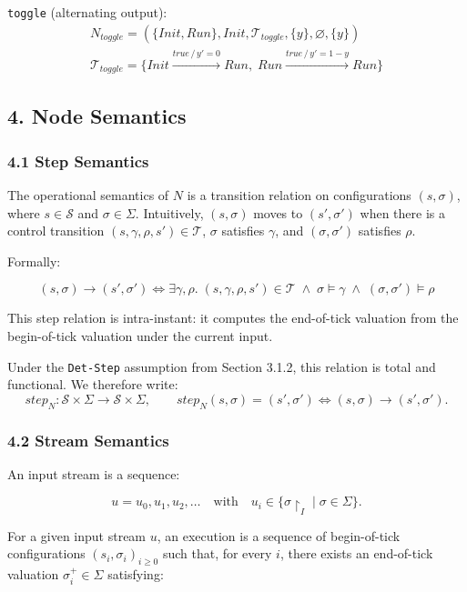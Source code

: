 \documentclass[
]{article}
\begin{document}
\texttt{toggle} (alternating output): \[
\begin{array}{l}
N_{toggle}=(\{Init,Run\},Init,\mathcal T_{toggle},\{y\},\varnothing,\{y\})\\
\mathcal T_{toggle}=\{Init\xrightarrow{true\,/\,y'=0}Run,\;Run\xrightarrow{true\,/\,y'=1-y}Run\}
\end{array}
\]

\subsection{4. Node Semantics}\label{node-semantics}

\subsubsection{4.1 Step Semantics}\label{step-semantics}

The operational semantics of \(N\) is a transition relation on
configurations \((s,\sigma)\), where \(s \in \mathcal S\) and
\(\sigma \in \Sigma\). Intuitively, \((s,\sigma)\) moves to
\((s',\sigma')\) when there is a control transition
\((s,\gamma,\rho,s') \in \mathcal T\), \(\sigma\) satisfies \(\gamma\),
and \((\sigma,\sigma')\) satisfies \(\rho\).

Formally:

\[
(s,\sigma) \to (s',\sigma')
\iff
\exists \gamma,\rho.\;
(s,\gamma,\rho,s')\in\mathcal T
\;\land\;
\sigma\models\gamma
\;\land\;
(\sigma,\sigma')\models\rho
\]

This step relation is intra-instant: it computes the end-of-tick
valuation from the begin-of-tick valuation under the current input.

Under the \texttt{Det-Step} assumption from Section 3.1.2, this relation
is total and functional. We therefore write: \[
step_N:\mathcal S\times\Sigma\to\mathcal S\times\Sigma,\qquad
step_N(s,\sigma)=(s',\sigma')\iff (s,\sigma)\to(s',\sigma').
\]

\subsubsection{4.2 Stream Semantics}\label{stream-semantics}

An input stream is a sequence:

\[
u = u_0,u_1,u_2,\dots
\quad\text{with}\quad
u_i \in \{\sigma\!\upharpoonright_I \mid \sigma \in \Sigma\}.
\]

For a given input stream \(u\), an execution is a sequence of
begin-of-tick configurations \((s_i,\sigma_i)_{i\ge 0}\) such that, for
every \(i\), there exists an end-of-tick valuation
\(\sigma_i^+ \in \Sigma\) satisfying:
\end{document}

